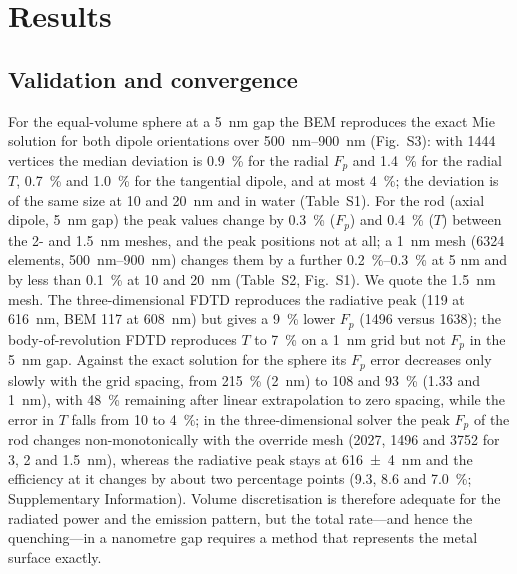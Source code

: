 \documentclass[11pt,a4paper]{article}
\newcommand{\Fp}{F_p}
\begin{document}
\section{Results}

\subsection{Validation and convergence}
For the equal-volume sphere at a \SI{5}{nm} gap the BEM reproduces the exact Mie solution for both dipole
orientations over \SIrange{500}{900}{nm} (Fig.~S3): with 1444 vertices the median deviation is
\SI{0.9}{\percent} for the radial $\Fp$ and \SI{1.4}{\percent} for the radial $T$, \SI{0.7}{\percent} and
\SI{1.0}{\percent} for the tangential dipole, and at most \SI{4}{\percent}; the deviation is of the same size at 10 and
\SI{20}{nm} and in water (Table~S1). For the rod (axial dipole, \SI{5}{nm} gap) the peak values change by
\SI{0.3}{\percent} ($\Fp$) and \SI{0.4}{\percent} ($T$) between the 2- and \SI{1.5}{nm} meshes, and the peak positions
not at all; a \SI{1}{nm} mesh (6324 elements, \SIrange{500}{900}{nm}) changes them by a further \SIrange{0.2}{0.3}{\percent} at 5 nm and by less than \SI{0.1}{\percent} at 10 and \SI{20}{nm}
(Table~S2, Fig.~S1). We quote the \SI{1.5}{nm} mesh. The three-dimensional FDTD reproduces the radiative peak
(119 at \SI{616}{nm}, BEM 117 at \SI{608}{nm}) but gives a \SI{9}{\percent} lower $\Fp$ (1496 versus 1638); the
body-of-revolution FDTD reproduces $T$ to \SI{7}{\percent} on a \SI{1}{nm} grid but not $\Fp$ in the \SI{5}{nm}
gap. Against the exact solution for the sphere its $\Fp$ error decreases only slowly with the grid spacing, from
\SI{215}{\percent} (\SI{2}{nm}) to 108 and \SI{93}{\percent} (1.33 and \SI{1}{nm}), with \SI{48}{\percent}
remaining after linear extrapolation to zero spacing, while the error in $T$ falls from 10 to \SI{4}{\percent}; in the
three-dimensional solver the peak $\Fp$ of the rod changes non-monotonically with the override mesh (2027, 1496 and
3752 for 3, 2 and \SI{1.5}{nm}), whereas the radiative peak stays at \SI{616\pm4}{nm} and the efficiency at it
changes by about two percentage points (9.3, 8.6 and \SI{7.0}{\percent}; Supplementary Information). Volume discretisation is therefore adequate for the radiated power and the emission
pattern, but the total rate---and hence the quenching---in a nanometre gap requires a method that represents the
metal surface exactly.
\end{document}
